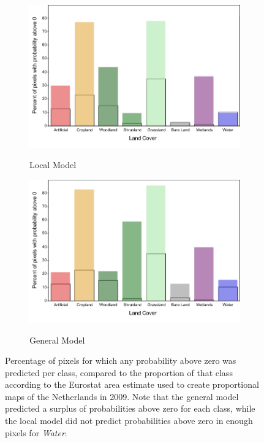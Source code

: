     \begin{figure}[H]
        \vspace*{-4cm}
        \centering
        \begin{subfigure}[b]{\textwidth}
            \centering
            \caption{Local Model}\includegraphics[width=\textwidth]{figs_04/fig7a_probability_pixels_NL_local.pdf}
            \label{fig:probability_pixels_local}
        \end{subfigure}
        \begin{subfigure}[b]{\textwidth}
           \centering
           \caption{General Model}
           \includegraphics[width=\textwidth]{figs_04/fig7b_probability_pixels_NL_general.pdf}
           \label{fig:probability_pixels_general}   
        \end{subfigure}
        
        \caption{Percentage of pixels for which any probability above zero was predicted per class, compared to the proportion of that class according to the Eurostat area estimate used to create proportional maps of the Netherlands in 2009. Note that the general model predicted a surplus of probabilities above zero for each class, while the local model did not predict probabilities above zero in enough pixels for \textit{Water}.}
        \label{fig:probability_pixels}
    \end{figure}



